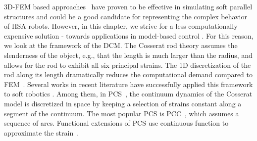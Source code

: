 3D-\gls{FEM} based approaches~\citep{farrell2020extension} have proven to be effective in simulating soft parallel structures \citep{vanneste2021enabling} and could be a good candidate for representing the complex behavior of \gls{HSA} robots. However, in this chapter, we strive for a less computationally expensive solution - towards applications in model-based control \citep{della2023model}. For this reason, we look at the framework of the \gls{DCM}. The Cosserat rod theory assumes the slenderness of the object, e.g., that the length is much larger than the radius, and allows for the rod to exhibit all six principal strains. The 1D discretization of the rod along its length dramatically reduces the computational demand compared to \gls{FEM}~\citep{gazzola2018forward}. 
%
Several works in recent literature have successfully applied this framework to soft robotics \citep{grazioso2019geometrically,sadati2021tmtdyn,armanini2023soft}. Among them, in \gls{PCS}~\citep{renda2018discrete}, the continuum dynamics of the Cosserat model is discretized in space by keeping a selection of strains constant along a segment of the continuum. %
The most popular \gls{PCS} is \gls{PCC}~\citep{webster2010design}, which assumes a sequence of arcs. Functional extensions of \gls{PCS} use continuous function to approximate the strain~\citep{della2019control,renda2020geometric}. %

